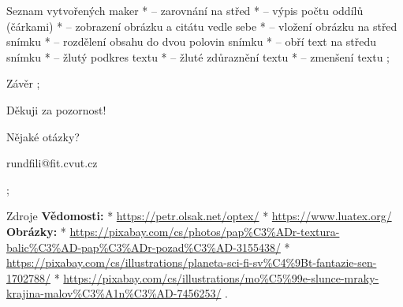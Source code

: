 \sec Seznam vytvořených maker
*  – zarovnání na střed
* \code{\\chapcnt} – výpis počtu oddílů (čárkami)
*  – zobrazení obrázku a citátu vedle sebe
*  – vložení obrázku na střed snímku
*  – rozdělení obsahu do dvou polovin snímku
*  – obří text na středu snímku
*  – žlutý podkres textu
*  – žluté zdůraznění textu
*  – zmenšení textu
\pg;

\chap Závěr
\chapcnt
\pg;

\sec Děkuji za pozornost!
\centerline{Nějaké otázky?}
\medskip
\centerline{rundfili@fit.cvut.cz}
\pg;

\sec Zdroje
    {\bf Vědomosti:}
* \url{https://petr.olsak.net/optex/}
* \url{https://www.luatex.org/}
\medskip
{\bf Obrázky:}
* \url{https://pixabay.com/cs/photos/pap\%C3\%ADr-textura-balic\%C3\%AD-pap\%C3\%ADr-pozad\%C3\%AD-3155438/}
* \url{https://pixabay.com/cs/illustrations/planeta-sci-fi-sv\%C4\%9Bt-fantazie-sen-1702788/}
* \url{https://pixabay.com/cs/illustrations/mo\%C5\%99e-slunce-mraky-krajina-malov\%C3\%A1n\%C3\%AD-7456253/}
\pg.